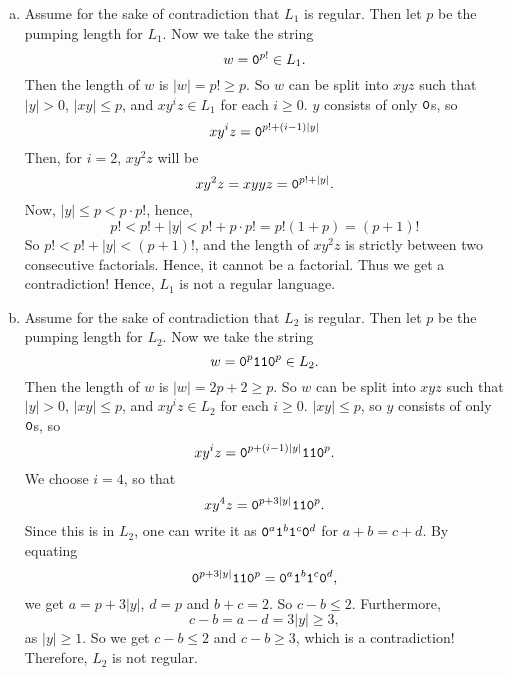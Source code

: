 \documentclass{article}
\begin{document}
\sectionline
\begin{enumerate}[(a)]
\item Assume for the sake of contradiction that \(L_1\) is regular. Then let \(p\) be the pumping length for \(L_1\). Now we take the string 
\[ w = \texttt{0}^{p!} \in L_1. \]
Then the length of \(w\) is \(|w| = p! \geq p\). So \(w\) can be split into \(xyz\) such that \(|y| > 0\), \(|xy| \leq p\), and \(xy^iz \in L_1\) for each \(i \geq 0\). \(y\) consists of only \(\texttt{0}\)s, so 
\[ xy^i z = \texttt{0}^{p! + (i-1) |y| } \]
Then, for \(i=2\), \(xy^2z\) will be 
\[ xy^2z = xyyz = \texttt{0}^{p! + |y|} .  \]
Now, \(|y| \le p < p \cdot p! \), hence, 
\[ p! < p! + |y| < p!  + p \cdot p! = p! \left(1+p\right) = (p+1)! \]
So \(p! < p! + |y| < (p+1)!\), and the length of \(xy^2z\) is strictly between two consecutive factorials. Hence, it cannot be a factorial. 
Thus we get a contradiction! Hence, \(L_1\) is not a regular language. 


\item Assume for the sake of contradiction that \(L_2\) is regular. Then let \(p\) be the pumping length for \(L_2\). Now we take the string 
\[ w = \texttt{0}^{p} \texttt{1} \texttt{1} \texttt{0}^p \in L_2. \]
Then the length of \(w\) is \(|w| = 2p+2 \geq p\). So \(w\) can be split into \(xyz\) such that \(|y| > 0\), \(|xy| \leq p\), and \(xy^iz \in L_2\) for each \(i \geq 0\). \(|xy| \le p\), so \(y\) consists of only \(\texttt{0}\)s, so 
\[ xy^i z = \texttt{0}^{p + (i-1) |y| } \texttt{1} \texttt{1} \texttt{0}^p . \]
We choose \(i=4\), so that 
\[ xy^4 z = \texttt{0}^{p + 3 |y| } \texttt{1} \texttt{1} \texttt{0}^p . \]
Since this is in \(L_2\), one can write it as \(\texttt{0}^a\texttt{1}^b\texttt{1}^c \texttt{0}^d\) for \(a+b=c+d\). By equating 
\[ \texttt{0}^{p + 3 |y| } \texttt{1} \texttt{1} \texttt{0}^p = \texttt{0}^a\texttt{1}^b\texttt{1}^c \texttt{0}^d ,  \]
we get \(a= p + 3 |y|\), \(d = p\) and \(b+c=2\). So \(c-b \le 2\). Furthermore, 
\[ c-b = a-d =  3 |y| \ge 3 ,  \]
as \(|y| \ge 1\). So we get \(c-b \le 2\) and \(c-b \ge 3\), which is a contradiction! Therefore, \(L_2\) is not regular. 


\end{enumerate}
\end{document}
